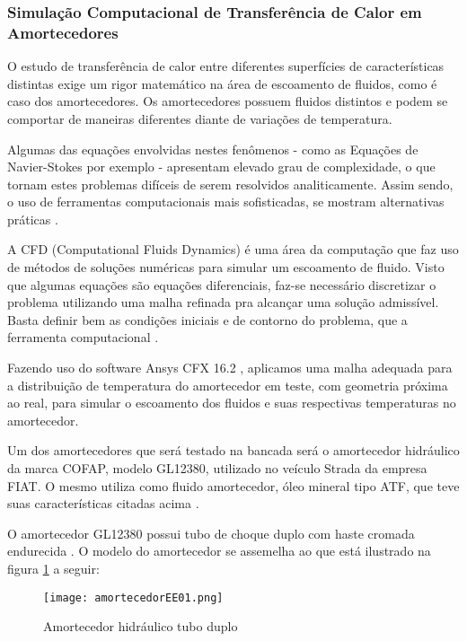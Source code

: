 \subsubsection{Simulação Computacional de Transferência de Calor em Amortecedores}

	O estudo de transferência de calor entre diferentes superfícies de características distintas exige um rigor matemático na área de escoamento de fluidos, como é caso dos amortecedores. Os amortecedores possuem fluidos distintos e podem se comportar de maneiras diferentes diante de variações de temperatura.
	
	Algumas das equações envolvidas nestes fenômenos - como as Equações de Navier-Stokes por exemplo - apresentam elevado grau de complexidade, o que tornam estes problemas difíceis de serem resolvidos analiticamente. Assim sendo, o uso de ferramentas computacionais mais sofisticadas, se mostram alternativas práticas \cite{Neto}. 
	
	A CFD (Computational Fluids Dynamics) é uma área da computação que faz uso de métodos de soluções numéricas para simular um escoamento de fluido. Visto que algumas equações são equações diferenciais, faz-se necessário discretizar o problema  utilizando uma malha refinada pra alcançar uma solução admissível. Basta definir bem as condições iniciais e de contorno do problema, que a ferramenta computacional \cite{Neto}. 
	
	Fazendo uso do software Ansys CFX 16.2 , aplicamos uma malha adequada para a distribuição de temperatura do amortecedor em teste, com geometria próxima ao real, para simular o escoamento dos fluidos  e suas respectivas temperaturas no amortecedor.
	
	Um dos amortecedores que será testado na bancada será o amortecedor hidráulico da marca COFAP, modelo GL12380, utilizado no veículo Strada da empresa FIAT. O mesmo utiliza como fluido amortecedor, óleo mineral tipo ATF, que teve suas características citadas acima \cite{Cofap}.
	
	O amortecedor GL12380 possui tubo de choque duplo com haste cromada endurecida \cite{Cofap}. O modelo do amortecedor se assemelha ao que está ilustrado na figura \ref{amortecedorEE01} a seguir:

	\newpage
	\begin{figure}[!h]
		\centering
		\texttt{[image: amortecedorEE01.png]}
		\caption[Amortecedor hidráulico tubo duplo]{Amortecedor hidráulico tubo duplo \cite{Cofap}} 
		\label{amortecedorEE01}
	\end{figure}


